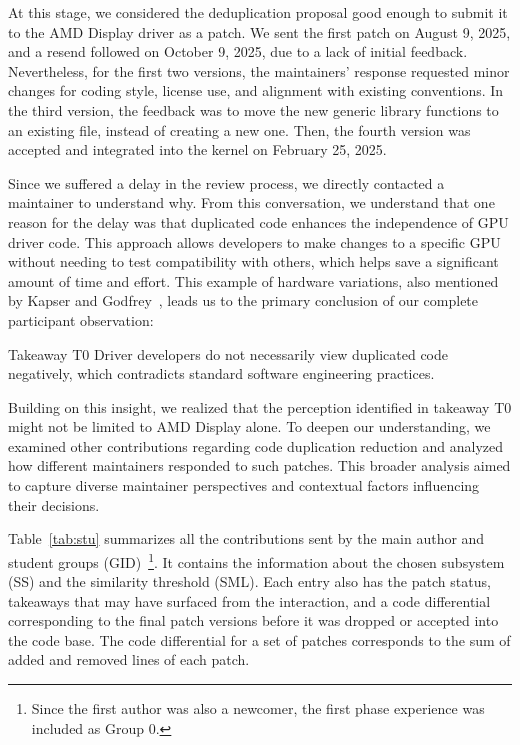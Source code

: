 \documentclass[10pt,conference]{IEEEtran}
\newenvironment{highlight-box}[1]{%
  \begin{tcolorbox}[colback=gray!10, colframe=gray!50!black, boxrule=0.5pt,
                    left=1mm, right=1mm, top=1mm, bottom=1mm, sharp corners]
  \textbf{#1:} \itshape}{\end{tcolorbox}}
\begin{document}
At this stage, we considered the deduplication proposal good enough to submit it to the AMD Display driver as a patch. We sent the first patch on August 9, 2025, and a resend followed on October 9, 2025, due to a lack of initial feedback. Nevertheless, for the first two versions, the maintainers' response requested minor changes for coding style, license use, and alignment with existing conventions. In the third version, the feedback was to move the new generic library functions to an existing file, instead of creating a new one. Then, the fourth version was accepted and integrated into the kernel on February 25, 2025.

Since we suffered a delay in the review process, we directly contacted a maintainer to understand why. From this conversation, we understand that one reason for the delay was that duplicated code enhances the independence of GPU driver code. This approach allows developers to make changes to a specific GPU without needing to test compatibility with others, which helps save a significant amount of time and effort. This example of hardware variations, also mentioned by Kapser and Godfrey~\cite{cloneharm}, leads us to the primary conclusion of our complete participant observation:
%
\begin{highlight-box}{Takeaway T0}
Driver developers do not necessarily view duplicated code negatively, which contradicts standard software engineering practices.
\end{highlight-box}

Building on this insight, we realized that the perception identified in takeaway T0 might not be limited to AMD Display alone. To deepen our understanding, we examined other contributions regarding code duplication reduction and analyzed how different maintainers responded to such patches. This broader analysis aimed to capture diverse maintainer perspectives and contextual factors influencing their decisions.

Table~\ref{tab:stu} summarizes all the contributions sent by the main author and student groups (GID)~\footnote{Since the first author was also a newcomer, the first phase experience was included as Group 0.}. It contains the information about the chosen subsystem (SS) and the similarity threshold (SML). Each entry also has the patch status, takeaways that may have surfaced from the interaction, and a code differential corresponding to the final patch versions before it was dropped or accepted into the code base. The code differential for a set of patches corresponds to the sum of added and removed lines of each patch.
\end{document}
